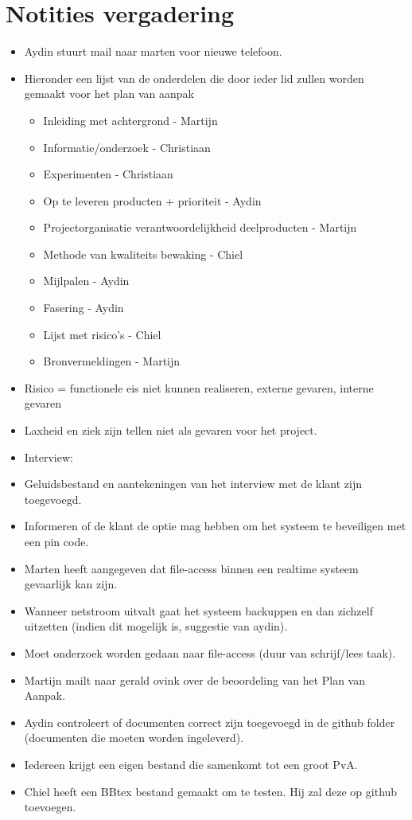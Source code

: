 \documentclass[dutch]{hu}
\begin{document}
\section{Notities vergadering}
\begin{itemize}

\item Aydin stuurt mail naar marten voor nieuwe telefoon.

\item Hieronder een lijst van de onderdelen die door ieder lid zullen worden gemaakt voor het plan van aanpak
\begin{itemize}[labelindent=1cm]
\item Inleiding met achtergrond - Martijn
\item Informatie/onderzoek - Christiaan
\item Experimenten - Christiaan
\item Op te leveren producten + prioriteit - Aydin
\item Projectorganisatie verantwoordelijkheid deelproducten - Martijn
\item Methode van kwaliteits bewaking - Chiel
\item Mijlpalen - Aydin
\item Fasering - Aydin
\item Lijst met risico's - Chiel
\item Bronvermeldingen - Martijn
\end{itemize}

\item Risico = functionele eis niet kunnen realiseren, externe gevaren, interne gevaren
\item Laxheid en ziek zijn tellen niet als gevaren voor het project.

\item Interview: 
\item Geluidsbestand en aantekeningen van het interview met de klant zijn toegevoegd.
\item Informeren of de klant de optie mag hebben om het systeem te beveiligen met een pin code.
\item Marten heeft aangegeven dat file-access binnen een realtime systeem gevaarlijk kan zijn.
\item Wanneer netstroom uitvalt gaat het systeem backuppen en dan zichzelf uitzetten (indien dit mogelijk is, suggestie van aydin).
\item Moet onderzoek worden gedaan naar file-access (duur van schrijf/lees taak).
\item Martijn mailt naar gerald ovink over de beoordeling van het Plan van Aanpak.
\item Aydin controleert of documenten correct zijn toegevoegd in de github folder (documenten die moeten worden ingeleverd).
\item Iedereen krijgt een eigen bestand die samenkomt tot een groot PvA.
\item Chiel heeft een BBtex bestand gemaakt om te testen. Hij zal deze op github toevoegen.

\end{itemize}
\end{document}

